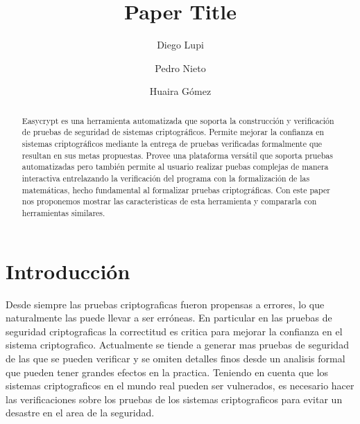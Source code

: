 \documentclass[runningheads]{llncs}
\begin{document}
\title{Paper Title}

\author{Diego Lupi\and Pedro Nieto\and Huaira Gómez}

%
%

\maketitle

\begin{abstract}
Easycrypt\cite{ref_article1} es una herramienta automatizada que soporta la construcción y verificación de pruebas de seguridad de sistemas criptográficos. Permite mejorar la confianza en sistemas criptográficos mediante la entrega de pruebas verificadas formalmente que resultan en sus metas propuestas. Provee una plataforma versátil que soporta pruebas automatizadas pero también permite al usuario realizar puebas complejas de manera interactiva entrelazando la verificación del programa con la formalización de las matemáticas, hecho fundamental al formalizar pruebas criptográficas. Con este paper nos proponemos mostrar las caracteristicas de esta herramienta y compararla con herramientas similares.

\end{abstract}
%
%
%
\section{Introducción}
Desde siempre las pruebas criptograficas fueron propensas a errores, lo que naturalmente las puede llevar a ser erróneas.
 En particular en las pruebas de seguridad criptograficas la correctitud es critica para mejorar la confianza en el sistema criptografico. Actualmente se tiende a generar mas pruebas de seguridad de las que se pueden verificar y se omiten detalles finos desde un analisis formal que pueden tener grandes efectos en la practica. Teniendo en cuenta que los sistemas criptograficos en el mundo real pueden ser vulnerados, es necesario hacer las verificaciones sobre los pruebas de los sistemas criptograficos para evitar un desastre en el area de la seguridad.
\end{document}
